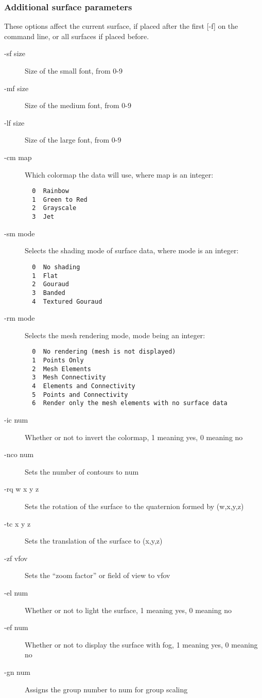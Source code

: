 \subsubsection{Additional surface parameters}
These options affect the current surface, if placed after the first [{-f}] on the command
line, or all surfaces if placed before.
\begin{description}
  \item [{-sf size}]  Size of the small font, from 0-9
  \item [{-mf size}]  Size of the medium font, from 0-9
  \item [{-lf size}]  Size of the large font, from 0-9
  \item [{-cm map}]   Which colormap the data will use, where map is an integer:
  \begin{verbatim}
  0  Rainbow
  1  Green to Red
  2  Grayscale
  3  Jet
  \end{verbatim}
  \item [{-sm mode}] Selects the shading mode of surface data, where mode is an integer:
  \begin{verbatim}
  0  No shading
  1  Flat
  2  Gouraud
  3  Banded
  4  Textured Gouraud
  \end{verbatim}
  \item [{-rm mode}] Selects the mesh rendering mode, mode being an integer:
  \begin{verbatim}
  0  No rendering (mesh is not displayed)
  1  Points Only
  2  Mesh Elements
  3  Mesh Connectivity
  4  Elements and Connectivity
  5  Points and Connectivity
  6  Render only the mesh elements with no surface data
  \end{verbatim}
  \item[{-ic num}] Whether or not to invert the colormap, 1 meaning yes, 0 meaning no
  \item[{-nco num}] Sets the number of contours to num
  \item[{-rq w x y z}] Sets the rotation of the surface to the quaternion formed by (w,x,y,z)
  \item[{-tc x y z}] Sets the translation of the surface to (x,y,z)
  \item[{-zf vfov}] Sets the ``zoom factor'' or field of view to vfov
  \item[{-el num}] Whether or not to light the surface, 1 meaning yes, 0 meaning no
  \item[{-ef num}] Whether or not to display the surface with fog, 1 meaning yes, 0 meaning no
  \item[{-gn num}] Assigns the group number to num for group scaling

\end{description}

